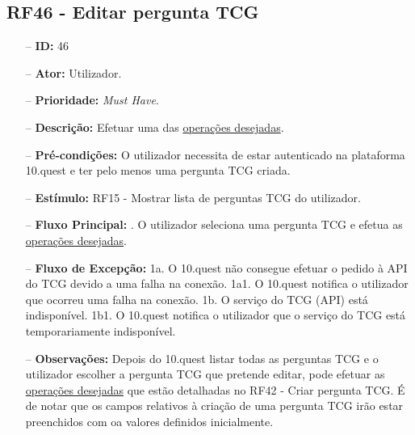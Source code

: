 \subsection{RF46 - Editar pergunta TCG}
\begin{itemize}
	\item[--] \textbf{ID:} 46
	\item[--]  \textbf{Ator:} Utilizador.
	\item[--]  \textbf{Prioridade:} \textit{Must Have}.
	\item[--]  \textbf{Descrição:} Efetuar uma das \underline{operações desejadas}.
	\item[--]  \textbf{Pré-condições:} O utilizador necessita de estar autenticado na plataforma 10.quest e ter pelo menos uma pergunta TCG criada.
	\item[--]  \textbf{Estímulo:} RF15 - Mostrar lista de perguntas TCG do utilizador.
	\item[--]  \textbf{Fluxo Principal:} 
	. O utilizador seleciona uma pergunta TCG e efetua as \underline{operações desejadas}.
	\item[--]  \textbf{Fluxo de Excepção:} 
	\subitem 1a. O 10.quest não consegue efetuar o pedido à API do TCG devido a uma falha na conexão.
	\subitem 1a1. O 10.quest notifica o utilizador que ocorreu uma falha na conexão.
	\subitem 1b. O serviço do TCG (API) está indisponível.
	\subitem 1b1. O 10.quest notifica o utilizador que o serviço do TCG está temporariamente indisponível. 
	\item[--]  \textbf{Observações:} Depois do 10.quest listar todas as perguntas TCG e o utilizador escolher a pergunta TCG que pretende editar, pode efetuar as \underline{operações desejadas} que estão detalhadas no RF42 - Criar pergunta TCG. É de notar que os campos relativos à criação de uma pergunta TCG irão estar preenchidos com oa valores definidos inicialmente.
\end{itemize}
\newpage

